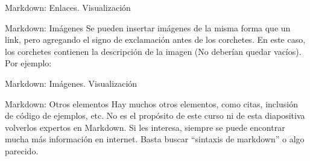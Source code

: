 
\begin{frame}{Markdown: Enlaces. Visualización}
\end{frame}


\begin{frame}{Markdown: Imágenes}
  Se pueden insertar imágenes de la misma forma que un link, pero agregando el
  signo de exclamación antes de los corchetes. En este caso, los corchetes
  contienen la descripción de la imagen (No deberían quedar vacíos).
  \jump
  Por ejemplo:
  \centerline{}
\end{frame}


\begin{frame}{Markdown: Imágenes. Visualización}
\end{frame}


\begin{frame}{Markdown: Otros elementos}
  Hay muchos otros elementos, como citas, inclusión de código de ejemplos,
  etc. No es el propósito de este curso ni de esta diapositiva volverlos
  expertos en Markdown.
  \jump
  Si les interesa, siempre se puede encontrar mucha más información en
  internet. Basta buscar ``sintaxis de markdown'' o algo parecido.
\end{frame}
